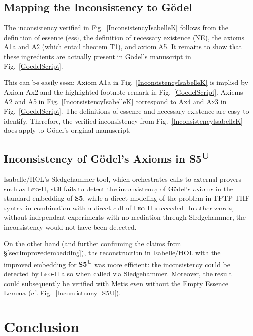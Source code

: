 \documentclass{llncs}
\newcommand{\logic}[1]{\textbf{#1}\xspace}
\newcommand{\SFive}{\logic{S5}}
\newcommand{\SFiveU}{\logic{S5\textsuperscript{U}}}
\begin{document}
\subsection{Mapping the Inconsistency to G\"odel}

The inconsistency verified in Fig.~\ref{InconsistencyIsabelleK} follows from the definition of
essence (ess), the definition of necessary existence (NE), the
axioms A1a and A2 (which entail theorem T1), and axiom A5. It remains to show that
these ingredients are actually present in G\"odel's manuscript in
Fig.~\ref{GoedelScript}. 


This can be easily seen: Axiom A1a in
Fig.~\ref{InconsistencyIsabelleK} is implied by Axiom Ax2 and the
highlighted footnote remark in Fig.~\ref{GoedelScript}. Axioms A2 and
A5 in Fig.~\ref{InconsistencyIsabelleK} correspond to Ax4 and Ax3 in
Fig.~\ref{GoedelScript}. The definitions of essence and necessary
existence are easy to identify. Therefore, the verified
inconsistency from Fig.~\ref{InconsistencyIsabelleK} does apply to 
G\"odel's original manuscript.


\subsection{Inconsistency of G\"odel's Axioms in \SFiveU}

Isabelle/HOL's Sledgehammer tool, which orchestrates calls to
external provers such as \textsc{Leo-II}, still
fails to detect the inconsistency of G\"odel's axioms in the standard
embedding of \SFive, while a direct modeling of the problem in TPTP THF syntax
in combination with a direct call of \textsc{Leo-II} succeeded. In
other words, without independent experiments with no mediation through Sledgehammer, the
inconsistency would not have been detected.


On the other hand (and further confirming the claims from \S\ref{sec:improvedembedding}), 
the reconstruction in Isabelle/HOL with the improved embedding for \SFiveU was more efficient: 
the inconsistency could be detected
by \textsc{Leo-II} also when called via
Sledgehammer. Moreover, the result could subsequently be verified with
Metis even without the Empty Essence Lemma (cf. Fig.~\ref{Inconsistency_S5U}). 



\section{Conclusion}\label{sec:conclusion}
\end{document}
